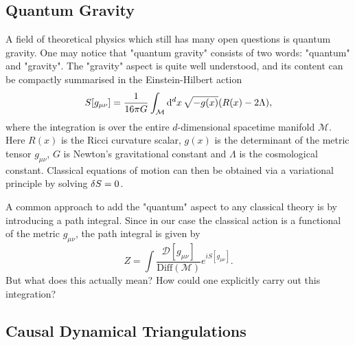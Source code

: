 \subsection{Quantum Gravity}

A field of theoretical physics which still has many open questions is quantum gravity. One may notice that "quantum gravity" consists of two words: "quantum" and "gravity". The "gravity" aspect is quite well understood, and its content can be compactly summarised in the Einstein-Hilbert action
\begin{equation}
    S[g_{\mu \nu}]
    =
    \frac{1}{16 \pi G}
    \int_{\mathcal{M}} \dd[d]{x} \sqrt{-g(x)}
    \qty(R(x) - 2 \Lambda)
    ,
\end{equation}
where the integration is over the entire $d$-dimensional spacetime manifold $\mathcal{M}$. Here $R(x)$ is the Ricci curvature scalar, $g(x)$ is the determinant of the metric tensor $g_{\mu \nu}$, $G$ is Newton's gravitational constant and $\Lambda$ is the cosmological constant. Classical equations of motion can then be obtained via a variational principle by solving $\variation{S} = 0$.

A common approach to add the "quantum" aspect to any classical theory is by introducing a path integral. Since in our case the classical action is a functional of the metric $g_{\mu \nu}$, the path integral is given by
\begin{equation}
    Z
    =
    \int \frac{\mathcal{D}[g_{\mu \nu}]}{\text{Diff}(\mathcal{M})}
    e^{i S[g_{\mu \nu}]}
    .
\end{equation}
But what does this actually mean? How could one explicitly carry out this integration?

\subsection{Causal Dynamical Triangulations}

